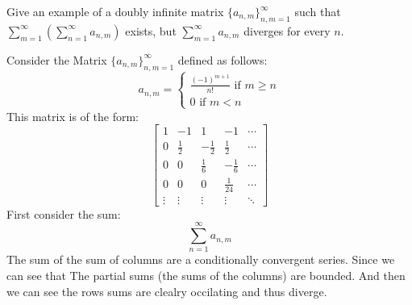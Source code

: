 \documentclass[answers,12pt,addpoints]{exam}
\begin{document}
\begin{questions}
        \question Give an example of a doubly infinite matrix \(\{a_{n,m}\}_{n,m=1}^{\infty}\) such that \(\sum_{m=1}^{\infty} \left(\sum_{n=1}^{\infty} a_{n,m}\right)\) exists, but \(\sum_{m=1}^{\infty} a_{n,m}\) diverges for every \(n\).
        \begin{solution}
            Consider the Matrix \(\{a_{n,m}\}_{n,m=1}^{\infty}\) defined as follows:
            $$ a_{n,m} = \begin{cases}
                \frac{(-1)^{m+1}}{n!} \text{ if } m \geq n\\
                0 \text{ if } m < n 
            \end{cases} $$
            This matrix is of the form:
            \[
            \begin{bmatrix}
                1 & -1 & 1 & -1 & \cdots \\
                0 & \frac{1}{2} & -\frac{1}{2} & \frac{1}{2} & \cdots \\
                0 & 0 & \frac{1}{6} & -\frac{1}{6} & \cdots \\
                0 & 0 & 0 & \frac{1}{24} & \cdots \\
                \vdots & \vdots & \vdots & \vdots & \ddots
            \end{bmatrix}
            \]
            First consider the sum:
            $$ \sum_{n=1}^{\infty} a_{n,m} $$
            The sum of the sum of columns are a conditionally convergent series. Since we can see that The partial sums (the sums of the columns) are bounded. And then we can see the rows sums are clealry occilating and thus diverge. 
        \end{solution}


\end{questions}
\end{document}
